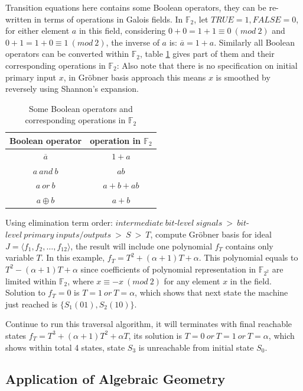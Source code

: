 Transition equations here contains some Boolean operators, they can be re-written in terms of operations in Galois fields. 
In $\mathbb{F}_{2}$, let $TRUE = 1, FALSE = 0$, for either element $a$ in this field, considering $0 + 0 = 1 + 1 \equiv 0\ (mod\ 2)$
and $0 + 1 = 1 + 0 \equiv 1\ (mod\ 2)$, the inverse of $a$ is: $\overline{a} = 1 + a$. Similarly all Boolean operators
can be converted within $\mathbb{F}_{2}$, table \ref{table:booltogalois_op} gives part of them and their corresponding
operations in $\mathbb{F}_{2}$:
Also note that there is no specification on initial primary input $x$, in Gr\"obner basis approach this means $x$ is smoothed by
reversely using Shannon's expansion.
\begin{table}[tb]
\centering
\caption{Some Boolean operators and corresponding operations in $\mathbb{F}_{2}$}
\begin{tabular}{|c|c|} \hline
Boolean operator & operation in $\mathbb{F}_{2}$\\ \hline
$\overline{a}$ & $1 + a$\\ \hline
$a\ and\ b$ & $ab$\\ \hline
$a\ or\ b$ & $a + b + ab$\\ \hline
$a \oplus b$ & $a + b$\\
\hline\end{tabular}
\label{table:booltogalois_op}
\end{table}
Using elimination term order: $intermediate\ bit$-$level\ signals\ >\ bit$-$level\ primary\ inputs/outputs\ >\ S\ >\ T$, compute Gr\"obner basis for ideal
$J = \langle f_1, f_2, \dots, f_{12}\rangle $, the result will include one polynomial $f_T$ contains only variable $T$. In this example,
$f_T = T^2+(\alpha+1)T+\alpha$. This polynomial equals to $T^2-(\alpha+1)T+\alpha$ since coefficients of polynomial representation in $\mathbb{F}_{2^2}$ are
limited within $\mathbb{F}_{2}$, where $x \equiv -x\ (mod\ 2)$ for any element $x$ in the field. Solution to $f_T = 0$ is $T = 1\ or \ T = \alpha$, which shows that next
state the machine just reached is $\{S_1(01), S_2(10)\}$.

Continue to run this traversal algorithm, it will terminates with final reachable states $f_T = T^3+(\alpha+1)T^2+\alpha T$, its solution is $T=0\ or\ T=1\ or\ T=\alpha$,
which shows within total 4 states, state $S_3$ is unreachable from initial state $S_0$.

\subsection{Application of Algebraic Geometry}


